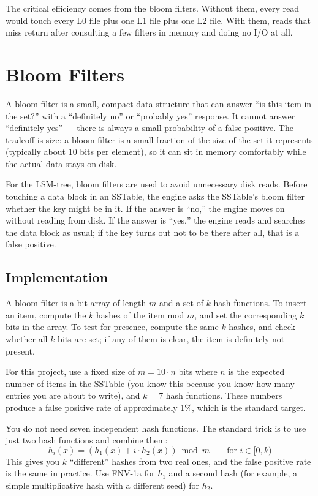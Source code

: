 \documentclass[11pt,a4paper]{article}
\begin{document}
The critical efficiency comes from the bloom filters. Without them, every read would touch every L0 file plus one L1 file plus one L2 file. With them, reads that miss return after consulting a few filters in memory and doing no I/O at all.

\section{Bloom Filters}

A bloom filter is a small, compact data structure that can answer ``is this item in the set?'' with a ``definitely no'' or ``probably yes'' response. It cannot answer ``definitely yes'' --- there is always a small probability of a false positive. The tradeoff is size: a bloom filter is a small fraction of the size of the set it represents (typically about 10 bits per element), so it can sit in memory comfortably while the actual data stays on disk.

For the LSM-tree, bloom filters are used to avoid unnecessary disk reads. Before touching a data block in an SSTable, the engine asks the SSTable's bloom filter whether the key might be in it. If the answer is ``no,'' the engine moves on without reading from disk. If the answer is ``yes,'' the engine reads and searches the data block as usual; if the key turns out not to be there after all, that is a false positive.

\subsection{Implementation}
A bloom filter is a bit array of length $m$ and a set of $k$ hash functions. To insert an item, compute the $k$ hashes of the item mod $m$, and set the corresponding $k$ bits in the array. To test for presence, compute the same $k$ hashes, and check whether all $k$ bits are set; if any of them is clear, the item is definitely not present.

For this project, use a fixed size of $m = 10 \cdot n$ bits where $n$ is the expected number of items in the SSTable (you know this because you know how many entries you are about to write), and $k = 7$ hash functions. These numbers produce a false positive rate of approximately 1\%, which is the standard target.

You do not need seven independent hash functions. The standard trick is to use just two hash functions and combine them:
\[
h_i(x) = (h_1(x) + i \cdot h_2(x)) \bmod m \qquad \text{for } i \in [0, k)
\]
This gives you $k$ ``different'' hashes from two real ones, and the false positive rate is the same in practice. Use FNV-1a for $h_1$ and a second hash (for example, a simple multiplicative hash with a different seed) for $h_2$.
\end{document}
